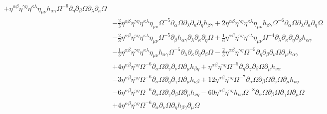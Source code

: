 \documentclass[10pt,letterpaper]{article}
\begin{document}
\begin{align}
 + \eta^{\alpha \beta} \eta^{\gamma \eta} \eta^{\kappa \lambda} \eta_{\mu \nu} h_{\alpha \gamma} \Omega^{-6} \partial_{\eta}\partial_{\beta}\Omega \partial_{\lambda}\partial_{\kappa}\Omega\nonumber\\
& -  \tfrac{2}{3} \eta^{\alpha \beta} \eta^{\gamma \eta} \eta^{\kappa \lambda} \eta_{\mu \nu} \Omega^{-5} \partial_{\alpha}\Omega \partial_{\lambda}\partial_{\kappa}\partial_{\eta}h_{\beta \gamma}
 + 2 \eta^{\alpha \beta} \eta^{\gamma \eta} \eta^{\kappa \lambda} \eta_{\mu \nu} h_{\beta \gamma} \Omega^{-6} \partial_{\alpha}\Omega \partial_{\lambda}\partial_{\kappa}\partial_{\eta}\Omega\nonumber\\
& -  \tfrac{2}{3} \eta^{\alpha \beta} \eta^{\gamma \eta} \eta^{\kappa \lambda} \eta_{\mu \nu} \Omega^{-5} \partial_{\beta}h_{\alpha \gamma} \partial_{\lambda}\partial_{\kappa}\partial_{\eta}\Omega
 + \tfrac{1}{6} \eta^{\alpha \beta} \eta^{\gamma \eta} \eta^{\kappa \lambda} \eta_{\mu \nu} \Omega^{-4} \partial_{\lambda}\partial_{\kappa}\partial_{\eta}\partial_{\beta}h_{\alpha \gamma}\nonumber\\
& -  \tfrac{1}{3} \eta^{\alpha \beta} \eta^{\gamma \eta} \eta^{\kappa \lambda} \eta_{\mu \nu} h_{\alpha \gamma} \Omega^{-5} \partial_{\lambda}\partial_{\kappa}\partial_{\eta}\partial_{\beta}\Omega
 -  \tfrac{2}{3} \eta^{\alpha \beta} \eta^{\gamma \eta} \Omega^{-5} \partial_{\eta}\partial_{\beta}\partial_{\nu}\Omega \partial_{\mu}h_{\alpha \gamma}\nonumber\\
& + 4 \eta^{\alpha \beta} \eta^{\gamma \eta} \Omega^{-6} \partial_{\alpha}\Omega \partial_{\gamma}\partial_{\nu}\Omega \partial_{\mu}h_{\beta \eta}
 + \eta^{\alpha \beta} \eta^{\gamma \eta} \Omega^{-5} \partial_{\eta}\partial_{\gamma}\partial_{\beta}\Omega \partial_{\mu}h_{\nu \alpha}\nonumber\\
& - 3 \eta^{\alpha \beta} \eta^{\gamma \eta} \Omega^{-6} \partial_{\alpha}\Omega \partial_{\eta}\partial_{\gamma}\Omega \partial_{\mu}h_{\nu \beta}
 + 12 \eta^{\alpha \beta} \eta^{\gamma \eta} \Omega^{-7} \partial_{\alpha}\Omega \partial_{\beta}\Omega \partial_{\gamma}\Omega \partial_{\mu}h_{\nu \eta}\nonumber\\
& - 6 \eta^{\alpha \beta} \eta^{\gamma \eta} \Omega^{-6} \partial_{\alpha}\Omega \partial_{\gamma}\partial_{\beta}\Omega \partial_{\mu}h_{\nu \eta}
 - 60 \eta^{\alpha \beta} \eta^{\gamma \eta} h_{\nu \eta} \Omega^{-8} \partial_{\alpha}\Omega \partial_{\beta}\Omega \partial_{\gamma}\Omega \partial_{\mu}\Omega\nonumber\\
& + 4 \eta^{\alpha \beta} \eta^{\gamma \eta} \Omega^{-6} \partial_{\alpha}\partial_{\nu}\Omega \partial_{\eta}h_{\beta \gamma} \partial_{\mu}\Omega

\end{align}
\end{document}
